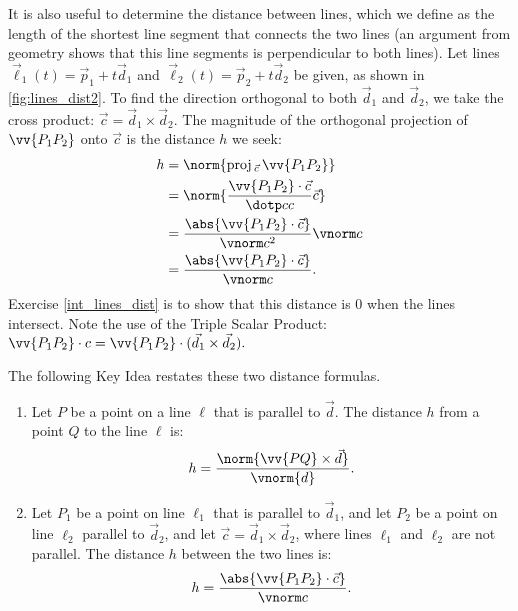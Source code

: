 It is also useful to determine the distance between lines, which we define as the length of the shortest line segment that connects the two lines (an argument from geometry shows that this line segments is perpendicular to both lines). Let lines $\vec\ell_1(t) = \vec p_1 + t\vec d_1$ and $\vec\ell_2(t) = \vec p_2 + t\vec d_2$ be given, as shown in \autoref{fig:lines_dist2}. To find the direction orthogonal to both $\vec d_1$ and $\vec d_2$, we take the cross product: $\vec c = \vec d_1\times \vec d_2$. The magnitude of the orthogonal projection of $\vv{P_1P_2}$ onto $\vec c$ is the distance $h$ we seek:
\begin{align*}
h&=		\norm{\text{proj}\,_{\vec c}\,\vv{P_1P_2}}\\
	&= \norm{\frac{\vv{P_1P_2}\cdot\vec c}{\dotp cc}\vec c}\\
	&=\frac{\abs{\vv{P_1P_2}\cdot \vec c}}{\vnorm c^2}\vnorm c\\
	&=\frac{\abs{\vv{P_1P_2}\cdot \vec c}}{\vnorm c}.
\end{align*}
Exercise \ref{int_lines_dist} is to show that this distance is 0 when the lines intersect. Note the use of the Triple Scalar Product: $\vv{P_1P_2}\cdot c = \vv{P_1P_2}\cdot (\vec d_1\times \vec d_2).$


The following Key Idea restates these two distance formulas.

{\begin{enumerate}
	\item Let $P$ be a point on a line $\ell$ that is parallel to $\vec d$. The distance $h$ from a point $Q$ to the line $\ell$ is:
	$$h =\frac{\norm{\vv{PQ}\times \vec d}}{\vnorm{d}}.$$
	\item	Let $P_1$ be a point on line $\ell_1$ that is parallel to $\vec d_1$, and let $P_2$ be a point on line $\ell_2$ parallel to $\vec d_2$, and let $\vec c = \vec d_1\times \vec d_2$, where lines $\ell_1$ and $\ell_2$ are not parallel. The distance $h$ between the two lines is:
	$$h=\frac{\abs{\vv{P_1P_2}\cdot \vec c}}{\vnorm c}.$$
\end{enumerate}}

